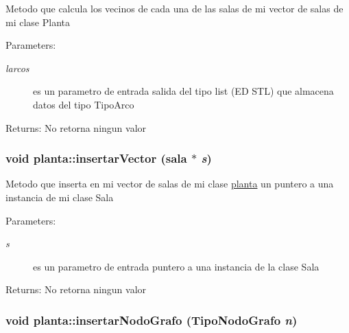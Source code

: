 Metodo que calcula los vecinos de cada una de las salas de mi vector de salas de mi clase Planta \begin{Desc}
\item[Parameters:]
\begin{description}
\item[{\em larcos}]es un parametro de entrada salida del tipo list (ED STL) que almacena datos del tipo TipoArco \end{description}
\end{Desc}
\begin{Desc}
\item[Returns:]No retorna ningun valor \end{Desc}
\hypertarget{classplanta_878639aab40d24f515031619abbd7a61}{
\subsubsection[insertarVector]{\setlength{\rightskip}{0pt plus 5cm}void planta::insertarVector ({\bf sala} $\ast$ {\em s})}}
\label{classplanta_878639aab40d24f515031619abbd7a61}


Metodo que inserta en mi vector de salas de mi clase \hyperlink{classplanta}{planta} un puntero a una instancia de mi clase Sala \begin{Desc}
\item[Parameters:]
\begin{description}
\item[{\em s}]es un parametro de entrada puntero a una instancia de la clase Sala \end{description}
\end{Desc}
\begin{Desc}
\item[Returns:]No retorna ningun valor \end{Desc}
\hypertarget{classplanta_8ba7df6396d9bad77c0f65a729e85ec6}{
\subsubsection[insertarNodoGrafo]{\setlength{\rightskip}{0pt plus 5cm}void planta::insertarNodoGrafo (TipoNodoGrafo {\em n})}}
\label{classplanta_8ba7df6396d9bad77c0f65a729e85ec6}


